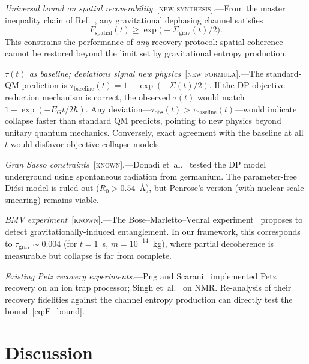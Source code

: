 \documentclass[prl,twocolumn,superscriptaddress,longbibliography,floatfix]{revtex4-2}
\newcommand{\tauasym}{\tau}
\begin{document}
\emph{Universal bound on spatial recoverability}~[\textsc{new
synthesis}].---From the master inequality chain of
Ref.~\cite{Paper1}, any gravitational dephasing channel satisfies
\begin{equation}
F_{\mathrm{spatial}}(t)
\geq \exp\!\big(-\Sigma_{\mathrm{grav}}(t)/2\big).
\label{eq:F_bound}
\end{equation}
This constrains the performance of \emph{any} recovery protocol:
spatial coherence cannot be restored beyond the limit set by
gravitational entropy production.

\emph{$\tauasym(t)$ as baseline; deviations signal new
physics}~[\textsc{new formula}].---The standard-QM prediction is
$\tauasym_{\mathrm{baseline}}(t) = 1 - \exp(-\Sigma(t)/2)$.  If the
DP objective reduction mechanism is correct, the observed
$\tauasym(t)$ would match $1 - \exp(-E_G t / 2\hbar)$.  Any
deviation---$\tauasym_{\mathrm{obs}}(t) >
\tauasym_{\mathrm{baseline}}(t)$---would indicate collapse
faster than standard QM predicts, pointing to new physics beyond
unitary quantum mechanics.  Conversely, exact agreement with the
baseline at all $t$ would disfavor objective collapse models.

\emph{Gran Sasso constraints}~[\textsc{known}].---Donadi
et~al.~\cite{Donadi2021} tested the DP model underground using
spontaneous radiation from germanium.  The parameter-free
Di\'{o}si model is ruled out ($R_0 > 0.54$~\AA), but Penrose's
version (with nuclear-scale smearing) remains
viable.

\emph{BMV experiment}~[\textsc{known}].---The
Bose--Marletto--Vedral experiment~\cite{Bose2017,Marletto2017}
proposes to detect gravitationally-induced entanglement.  In our
framework, this corresponds to $\tauasym_{\mathrm{grav}} \sim 0.004$
(for $t = 1$~s, $m = 10^{-14}$~kg), where partial decoherence is
measurable but collapse is far from complete.

\emph{Existing Petz recovery experiments}.---Png and
Scarani~\cite{Png2025} implemented Petz recovery on an ion trap
processor; Singh et~al.~\cite{Singh2025} on NMR.  Re-analysis of
their recovery fidelities against the channel entropy production
can directly test the bound~\eqref{eq:F_bound}.

\section{Discussion}
\label{sec:discussion}
\end{document}
